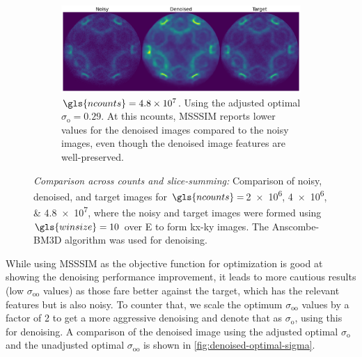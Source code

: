 \begin{figure}
    \begin{subfigure}[b]{1\linewidth}
        \centering
        \includegraphics[width=1\linewidth]{images/noisy_denoised_ref_48M_avg_bm3d.pdf}
        \caption{$\gls{ncounts}=\num{4.8e7}$. Using the adjusted optimal $\sigma_{\text{o}}=0.29$. At this \gls{ncounts}, \gls{MSSSIM} reports lower values for the denoised images compared to the noisy images, even though the denoised image features are well-preserved.}
        \label{fig:noisy-denoised-ref-48M-avg-bm3d}
    \end{subfigure}
    \caption{\textit{Comparison across counts and slice-summing:} Comparison of noisy, denoised, and target images for $\gls{ncounts}=$\numlist{2e6;4e6;4.8e7}, where the noisy and target images were formed using $\gls{winsize}=\num{10}$ over \gls{E} to form \gls{kx}-\gls{ky} images. The Anscombe-\gls{BM3D} algorithm was used for denoising.}
    \label{fig:combined-noisy-denoised}
\end{figure}

While using \gls{MSSSIM} as the objective function for optimization is good at showing the denoising performance improvement, it leads to more cautious results (low $\sigma_{\text{oo}}$ values) as those fare better against the target, which has the relevant features but is also noisy. To counter that, we scale the optimum $\sigma_{\text{oo}}$ values by a factor of \num{2} to get a more aggressive denoising and denote that as $\sigma_{\text{o}}$, using this for denoising. A comparison of the denoised image using the adjusted optimal $\sigma_{\text{o}}$ and the unadjusted optimal $\sigma_{\text{oo}}$ is shown in \cref{fig:denoised-optimal-sigma}.

